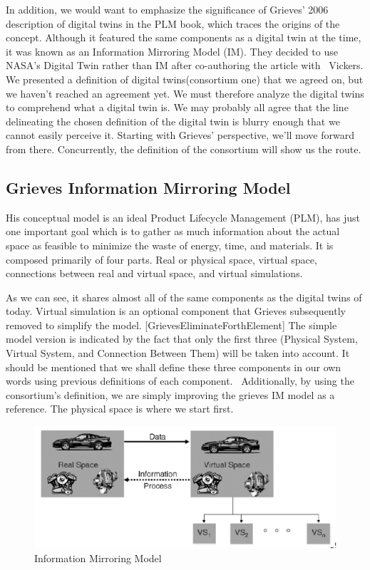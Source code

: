 \documentclass[9pt,conference]{IEEEtran}
\begin{document}
    In addition, we would want to emphasize the significance of Grieves' 2006 description of digital twins in the PLM book, which traces the origins of the concept. Although it featured the same components as a digital twin at the time, it was known as an Information Mirroring Model (IM). They decided to use NASA's Digital Twin rather than IM after co-authoring the article with  Vickers.
    We presented a definition of digital twins(consortium one) that we agreed on, but we haven't reached an agreement yet. We must therefore analyze the digital twins to comprehend what a digital twin is. We may probably all agree that the line delineating the chosen definition of the digital twin is blurry enough that we cannot easily perceive it. Starting with Grieves' perspective, we'll move forward from there. Concurrently, the definition of the consortium will show us the route.

    \subsection{Grieves Information Mirroring Model}

    His conceptual model is an ideal Product Lifecycle Management (PLM), has just one important goal which is to gather as much information about the actual space as feasible to minimize the waste of energy, time, and materials. 
    It is composed primarily of four parts. Real or physical space, virtual space, connections between real and virtual space, and virtual simulations.

    As we can see, it shares almost all of the same components as the digital twins of today. Virtual simulation is an optional component that Grieves subsequently removed to simplify the model. [GrievesEliminateForthElement] 
    The simple model version is indicated by the fact that only the first three (Physical System, Virtual System, and Connection Between Them) will be taken into account. 
    It should be mentioned that we shall define these three components in our own words using previous definitions of each component.  Additionally, by using the consortium's definition, we are simply improving the grieves IM model as a reference.
    The physical space is where we start first.

    
    \begin{figure}[htbp]
        \includegraphics[width=\columnwidth]{Grieves Information Mirroring Model.png}
        \caption{Information Mirroring Model}
        \label{IM}
    \end{figure}
\end{document}
